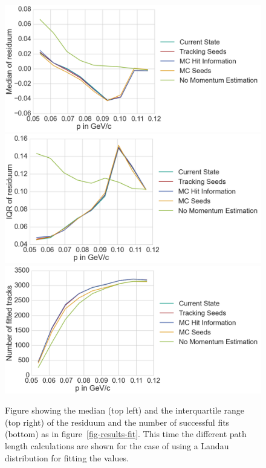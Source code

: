 \begin{figure}
  \centering
  \includegraphics[width=0.48\linewidth]{figures/vxd/landauKalman0_3Median.png}
  \includegraphics[width=0.48\linewidth]{figures/vxd/landauKalman0_3IQR.png}
  \includegraphics[width=0.48\linewidth]{figures/vxd/landauKalman0_3Count.png}
  \caption[Residuum of the momentum estimation for different path length calculations.]{Figure showing the median (top left) and the interquartile range (top right) of the residuum and the number of successful fits (bottom) as in figure~\ref{fig-results-fit}. This time the different path length calculations are shown for the case of using a Landau distribution for fitting the \dedx values.}
  \label{fig-results-fit2}
\end{figure}

